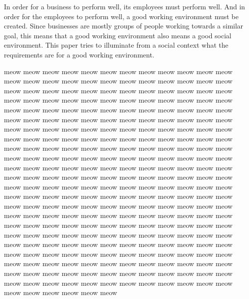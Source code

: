In order for a business to perform well, its employees must perform well. And in order for the employees to perform well, a good working environment must be created. Since businesses are mostly groups of people working towards a similar goal, this means that a good working environment also means a good social environment. This paper tries to illuminate from a social context what the requirements are for a good working environment.




meow meow meow meow meow meow meow meow meow meow meow meow meow meow meow meow meow meow meow meow meow meow meow meow meow meow meow meow meow meow meow meow meow meow meow meow meow meow meow meow meow meow meow meow meow meow meow meow meow meow meow meow meow meow meow meow meow meow meow meow meow meow meow meow meow meow meow meow meow meow meow meow meow meow meow meow meow meow meow meow meow meow meow meow meow meow meow meow meow meow meow meow meow meow meow meow meow meow meow meow meow meow meow meow meow meow meow meow meow meow meow meow meow meow meow meow meow meow meow meow meow meow meow meow meow meow meow meow meow meow meow meow meow meow meow meow meow meow meow meow meow meow meow meow meow meow meow meow meow meow meow meow meow meow meow meow meow meow meow meow meow meow meow meow meow meow meow meow meow meow meow meow meow meow meow meow meow meow meow meow meow meow meow meow meow meow meow meow meow meow meow meow meow meow meow meow meow meow meow meow meow meow meow meow meow meow meow meow meow meow meow meow meow meow meow meow meow meow meow meow meow meow meow meow meow meow meow meow meow meow meow meow meow meow meow meow meow meow meow meow meow meow meow meow meow meow meow meow meow meow meow meow meow meow meow meow meow meow meow meow meow meow meow meow meow meow meow meow meow meow meow meow meow meow meow meow meow meow meow meow meow meow 
